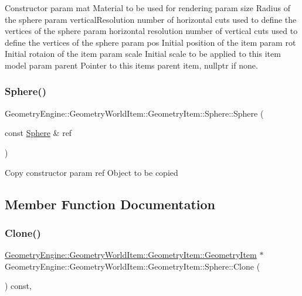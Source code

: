 Constructor param mat Material to be used for rendering param size Radius of the sphere param vertical\+Resolution number of horizontal cuts used to define the vertices of the sphere param horizontal resolution number of vertical cuts used to define the vertices of the sphere param pos Initial position of the item param rot Initial rotaion of the item param scale Initial scale to be applied to this item model param parent Pointer to this items parent item, nullptr if none. \mbox{\label{class_geometry_engine_1_1_geometry_world_item_1_1_geometry_item_1_1_sphere_a65773e4801ab90a98d73a2905c785fd3}} 
\subsubsection{\texorpdfstring{Sphere()}{Sphere()}\hspace{0.1cm}{\footnotesize\ttfamily [2/2]}}
{\footnotesize\ttfamily Geometry\+Engine\+::\+Geometry\+World\+Item\+::\+Geometry\+Item\+::\+Sphere\+::\+Sphere (\begin{DoxyParamCaption}\item[{const \mbox{\hyperlink{class_geometry_engine_1_1_geometry_world_item_1_1_geometry_item_1_1_sphere}{Sphere}} \&}]{ref }\end{DoxyParamCaption})}

Copy constructor param ref Object to be copied 

\subsection{Member Function Documentation}
\mbox{\label{class_geometry_engine_1_1_geometry_world_item_1_1_geometry_item_1_1_sphere_aaf5b7221c60ac1feefaacff14a20c1f3}} 
\subsubsection{\texorpdfstring{Clone()}{Clone()}}
{\footnotesize\ttfamily \mbox{\hyperlink{class_geometry_engine_1_1_geometry_world_item_1_1_geometry_item_1_1_geometry_item}{Geometry\+Engine\+::\+Geometry\+World\+Item\+::\+Geometry\+Item\+::\+Geometry\+Item}} $\ast$ Geometry\+Engine\+::\+Geometry\+World\+Item\+::\+Geometry\+Item\+::\+Sphere\+::\+Clone (\begin{DoxyParamCaption}{ }\end{DoxyParamCaption}) const\hspace{0.3cm}{\ttfamily [override]}, {\ttfamily [virtual]}}

